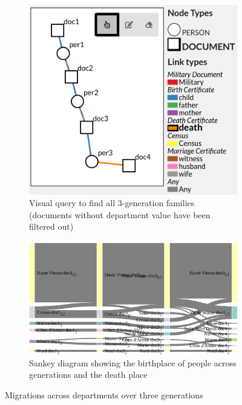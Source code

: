 \begin{figure}
    \begin{subfigure}{0.49\linewidth}
        \includegraphics[width=\textwidth]{static/figures/ComBiNet/OriginalPaperFigures/CGF/frenchGenealogy/migrationQuery.png}
        \caption{Visual query to find all 3-generation families (documents without department value have been filtered out)}
        \label{fig:UseCaseNicoleQ}
    \end{subfigure}
    \begin{subfigure}{0.49\linewidth}
        \includegraphics[width=\textwidth]{static/figures/ComBiNet/OriginalPaperFigures/CGF/frenchGenealogy/migration3.pdf}
        \caption{Sankey diagram showing the birthplace of people across generations and the death place}
        \label{fig:UseCaseNicoleS}
    \end{subfigure}

    \caption{Migrations across departments over three generations}  \label{fig:useCaseNicole}
\end{figure}

